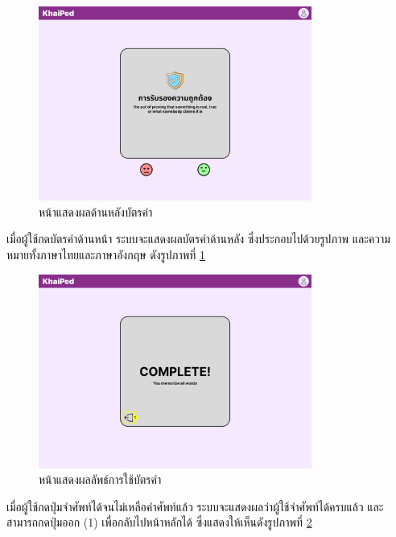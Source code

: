 \documentclass[12pt,oneside,openright,a4paper]{cpe-thai-project}
\begin{document}
\begin{figure}[!h]\centering
	\includegraphics[width=0.8\textwidth, keepaspectratio=true]{image/chap3/ui/flashcard/Flashcard - Flip Card.png}
	\caption{หน้าแสดงผลด้านหลังบัตรคำ}\label{fig:UI_FlipCard}
\end{figure}
\hspace{1cm}
เมื่อผู้ใช้กดบัตรคำด้านหน้า ระบบจะแสดงผลบัตรคำด้านหลัง ซึ่งประกอบไปด้วยรูปภาพ และความหมายทั้งภาษาไทยและภาษาอังกฤษ ดังรูปภาพที่ \ref{fig:UI_FlipCard}

\pagebreak
\begin{figure}[!h]\centering
	\includegraphics[width=0.8\textwidth, keepaspectratio=true]{image/chap3/ui/flashcard/Flashcard - Complete.png}
	\caption{หน้าแสดงผลลัพธ์การใช้บัตรคำ}\label{fig:UI_FlashcardResult}
\end{figure}
\hspace{1cm}
เมื่อผู้ใช้กดปุ่มจำศัพท์ได้จนไม่เหลือคำศัพท์แล้ว ระบบจะแสดงผลว่าผู้ใช้จำศัพท์ได้ครบแล้ว และสามารถกดปุ่มออก (1) เพื่อกลับไปหน้าหลักได้ ซึ่งแสดงให้เห็นดังรูปภาพที่ \ref{fig:UI_FlashcardResult}

\pagebreak
\end{document}
